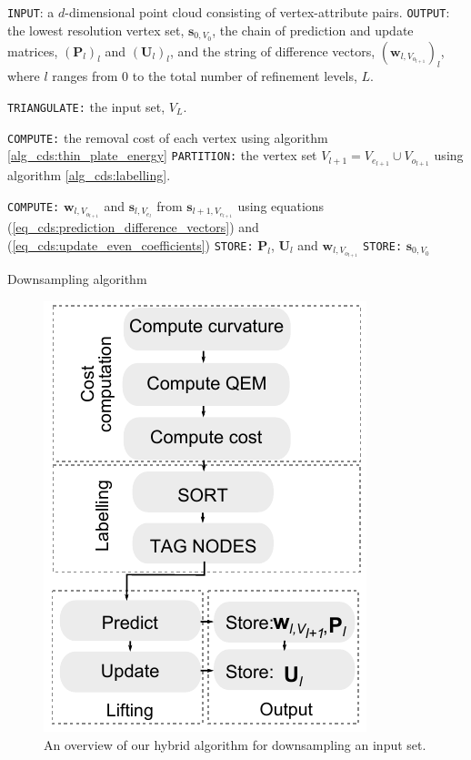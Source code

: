 \documentclass[graybox]{svmult}
\begin{document}
	\begin{algorithm}[t]
		\begin{algorithmic}
			\STATE \texttt{INPUT}: a $d$-dimensional point cloud consisting of vertex-attribute pairs.
			\STATE \texttt{OUTPUT}: the lowest resolution vertex set, $\mathbf{s}_{0, V_0}$, the chain of prediction and update matrices, $(\mathbf{P}_l)_l$ and $(\mathbf{U}_l)_l$, and
			the string of difference vectors, $(\mathbf{w}_{l,V_{o_{l+1}}})_l$, where $l$ ranges from $0$ to the total number of refinement levels, $L$.
			
			\STATE \texttt{TRIANGULATE:} the input set, $V_L$.
			
			
			\STATE \texttt{COMPUTE:} the removal cost of each vertex using algorithm \ref{alg_cds:thin_plate_energy}
			\STATE \texttt{PARTITION:} the vertex set $V_{l+1} = V_{e_{l+1}} \cup V_{o_{l+1}}$ using algorithm \ref{alg_cds:labelling}.
			
			\STATE \texttt{COMPUTE:} $\mathbf{w}_{l,V_{o_{l+1}}}$ and $\mathbf{s}_{l,V_{e_{l}}}$ from $\mathbf{s}_{l+1,V_{e_{l+1}}}$ using equations (\ref{eq_cds:prediction_difference_vectors}) 
			and (\ref{eq_cds:update_even_coefficients})
			\STATE \texttt{STORE:} $\mathbf{P}_l$, $\mathbf{U}_l$ and $\mathbf{w}_{l,V_{o_{l+1}}}$
			\ENDFOR
			\STATE \texttt{STORE:}  $\mathbf{s}_{0,V_0}$
		\end{algorithmic}
		\caption{Downsampling algorithm}
		\label{alg_cds:downsampling}
	\end{algorithm}
	
	\begin{figure}[htb]
		\centering
		\includegraphics[width=.7\linewidth]{overview_downsampling.pdf}
		\caption{\label{fig_cds:overview_downsampling}
			An overview of our hybrid algorithm for downsampling an input set.}
	\end{figure}
	
\end{document}
